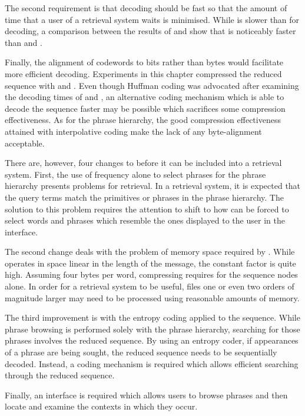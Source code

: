The second requirement is that decoding should be fast so that
the amount of time that a user of a retrieval system waits 
is minimised.  While \repair is slower than \gzip for 
decoding, a comparison between the results
of  and  show that
\repair is noticeably faster than \bzip and \ppmd.

Finally, the alignment of codewords to bits rather than bytes
would facilitate more efficient decoding.  Experiments in this
chapter compressed the reduced sequence with \shuff and \uint.
Even though Huffman coding was advocated after
examining the decoding times of \shuff and \uint, an alternative coding
mechanism which is able to decode the sequence faster may be
possible which sacrifices some compression effectiveness.  
As for the phrase hierarchy, the good compression effectiveness 
attained with interpolative coding make the 
lack of any byte-alignment acceptable.

There are, however, four changes to \repair before it can be
included into a retrieval system.
First, the use of 
frequency alone to select phrases for the phrase hierarchy
presents problems for retrieval.  
In a retrieval system, it is expected that the query terms match
the primitives or phrases in the phrase hierarchy.
The solution to this problem requires the 
attention to shift to how \repair can be forced to select
words and phrases which resemble the ones displayed to the
user in the interface.

The second change deals with the problem of memory
space required by \repair.
While \repair operates in space linear in the 
length of the message, the constant factor is quite high.  
Assuming four bytes per word, compressing
\wsja requires  for the sequence nodes alone.
In order for a retrieval system to be useful, files
one or even two orders of magnitude larger 
may need to be processed using reasonable 
amounts of memory.

The third improvement is with the entropy coding applied to the 
sequence. While phrase browsing is performed solely with the 
phrase hierarchy, searching for those phrases involves the 
reduced sequence.  By using an entropy coder, if appearances 
of a phrase are being sought, the reduced sequence 
needs to be sequentially decoded.  Instead, a
coding mechanism is required which allows efficient searching
through the reduced sequence.

Finally, an interface is required which allows users
to browse phrases and then locate and examine the contexts in 
which they occur.

